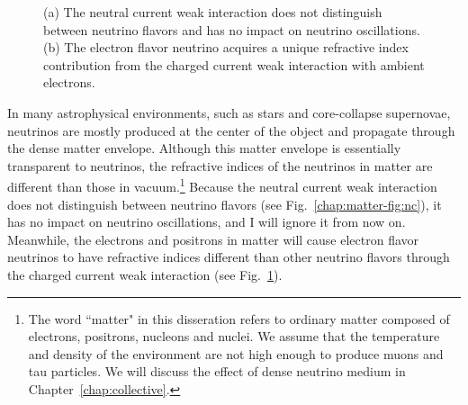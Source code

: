\begin{figure}[htbp]
\begin{subfigure}[t]{0.40\textwidth}
    \caption{  }
    \label{chap:matter-fig:cc}
	\end{subfigure}
	\caption{
  (a) The neutral current weak interaction does not distinguish between neutrino flavors and has no impact on neutrino oscillations. (b) The electron flavor neutrino acquires a unique refractive index contribution from the charged current weak interaction with ambient electrons.
  }
    \label{chap:matter-fig:nc-cc}
\end{figure}

In many astrophysical environments, such as stars and core-collapse supernovae, neutrinos are mostly produced at the center of the object and propagate through the dense matter envelope. Although this matter envelope is essentially transparent to neutrinos, the refractive indices of the neutrinos in matter are different than those in vacuum.\footnote{The word ``matter" in this disseration refers to ordinary matter composed of electrons, positrons, nucleons and nuclei. We assume that the temperature and density of the environment are not high enough to produce muons and tau particles. We will discuss the effect of dense neutrino medium in Chapter~\ref{chap:collective}.} Because the neutral current weak interaction does not distinguish between neutrino flavors (see Fig.~\ref{chap:matter-fig:nc}), it has no impact on neutrino oscillations, and I will ignore it from now on. Meanwhile, the electrons and positrons in matter will cause electron flavor neutrinos to have refractive indices different than other neutrino flavors through the charged current weak interaction (see Fig.~\ref{chap:matter-fig:cc}).
